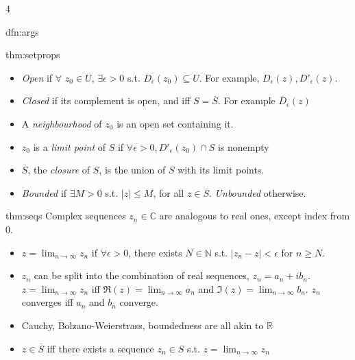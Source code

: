 \documentclass[landscape, 8pt]{extarticle}
\begin{document}
\begin{multicols*}{4}
\begin{dfn}{dfn:args}{ }
		\end{dfn}
		
		
		\begin{thm}{thm:setprops}{ }
			\begin{itemize}
				\item \textit{Open} if $\forall$ $z_0 \in U$, $\exists \epsilon > 0$ s.t. $D_\epsilon(z_0) \subseteq U$. For example, $D_\epsilon(z), D'_\epsilon(z)$.
				\item \textit{Closed} if its complement is open, and iff $S = \overline{S}$. For example $\overline{D}_\epsilon(z)$
				\item A \textit{neighbourhood} of $z_0$ is an open set containing it.
				\item $z_0$ is a \textit{limit point} of $S$ if $\forall \epsilon > 0, D'_\epsilon(z_0) \cap S$ is nonempty
				\item $\overline{S}$, the \textit{closure} of $S$, is the union of $S$ with its limit points.
				\item \textit{Bounded} if $\exists M>0$ s.t. $\left|z\right| \le M$, for all $z \in S$. \textit{Unbounded} otherwise.
			\end{itemize}	
			
		\end{thm}
		
		
		\begin{dfn}{thm:seqs}{ }
			Complex sequences $z_n \in \mathbb{C}$ are analogous to real ones, except index from $0$.
			\begin{itemize}
				\item $z = \lim_{n\to \infty}z_n$ if $\forall \epsilon > 0$, there exists $N \in \mathbb{N}$ s.t. $\left|z_n - z\right| <\epsilon$ for $n \ge N$.
				\item $z_n$ can be split into the combination of real sequences, $z_n = a_n + ib_n$. $z = \lim_{n\to \infty}z_n$ iff $\Re(z) = \lim_{n\to \infty} a_n$ and $\Im(z) = \lim_{n\to \infty} b_n$. $z_n$ converges iff $a_n$ and $b_n$ converge.
				\item Cauchy, Bolzano-Weierstrass, boundedness are all akin to $\mathbb{R}$
				\item $z \in \overline{S}$ iff there exists a sequence $z_n \in S$ s.t. $z = \lim_{n\to \infty} z_n$
			\end{itemize}
			
		\end{dfn}
		

\end{multicols*}
\end{document}
